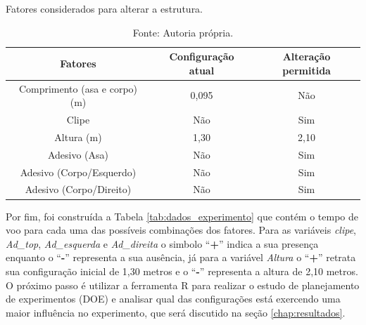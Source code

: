 \begin{table}[H]
  \caption{Fatores considerados para alterar a estrutura.}
  \centering
  \begin{tabular}{|c|c|c|}
  \hline
  \rowcolor[HTML]{EFEFEF} 
  \textbf{Fatores}              & \textbf{Configuração atual} & \textbf{Alteração permitida} \\ \hline
  Comprimento (asa e corpo) (m) & 0,095                       & Não                          \\ \hline
  \rowcolor[HTML]{EFEFEF} 
  Clipe                         & Não                         & Sim                          \\ \hline
  \rowcolor[HTML]{FFFFFF} 
  Altura (m)                    & 1,30                        & 2,10                         \\ \hline
  \rowcolor[HTML]{EFEFEF} 
  Adesivo (Asa)                 & Não                         & Sim                          \\ \hline
  \rowcolor[HTML]{FFFFFF} 
  Adesivo (Corpo/Esquerdo)         & Não                         & Sim                          \\ \hline
  \rowcolor[HTML]{EFEFEF} 
  Adesivo (Corpo/Direito)          & Não                         & Sim                          \\ \hline
  \end{tabular}
  \caption*{Fonte: Autoria própria.}
  \label{tab:fatores}
  \end{table}

Por fim, foi construída a Tabela \ref{tab:dados_experimento} que contém o tempo de voo para cada uma das possíveis combinações dos fatores. Para as variáveis \textit{clipe}, \textit{Ad\_top}, \textit{Ad\_esquerda} e \textit{Ad\_direita} o simbolo ``\textbf{+}'' indica a sua presença enquanto o ``\textbf{-}'' representa a sua ausência, já para a variável \textit{Altura} o ``\textbf{+}'' retrata sua configuração inicial de 1,30 metros e o ``\textbf{-}'' representa a altura de 2,10 metros. O próximo passo é utilizar a ferramenta R para realizar o estudo de planejamento de experimentos (DOE) e analisar qual das configurações está exercendo uma maior influência no experimento, que será discutido na seção \ref{chap:resultados}.

